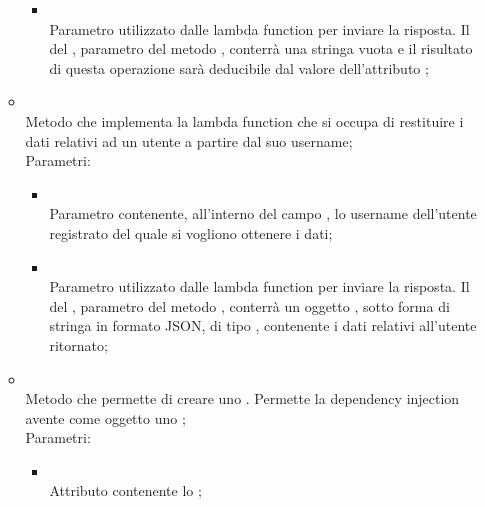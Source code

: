 \begin{itemize}
\begin{itemize}
\begin{itemize}
			\item {} \\
			Parametro utilizzato dalle lambda function per inviare la risposta. Il  del , parametro del metodo , conterrà una stringa vuota e il risultato di questa operazione sarà deducibile dal valore dell'attributo ;
		\end{itemize}
		\item[]  \\
		Metodo che implementa la lambda function che si occupa di restituire i dati relativi ad un utente a partire dal suo username;\\
		Parametri:
		\begin{itemize}
			\item {} \\
			Parametro contenente, all'interno del campo , lo username dell'utente registrato del quale si vogliono ottenere i dati;
			\item {} \\
			Parametro utilizzato dalle lambda function per inviare la risposta. Il  del , parametro del metodo , conterrà un oggetto , sotto forma di stringa in formato JSON, di tipo , contenente i dati relativi all'utente ritornato;
		\end{itemize}
		\item[]  \\
		Metodo che permette di creare uno . Permette la dependency injection avente come oggetto uno ;\\
		Parametri:
		\begin{itemize}
			\item {} \\
			Attributo contenente lo ;
		\end{itemize}
	\end{itemize}
\end{itemize}
\FloatBarrier


